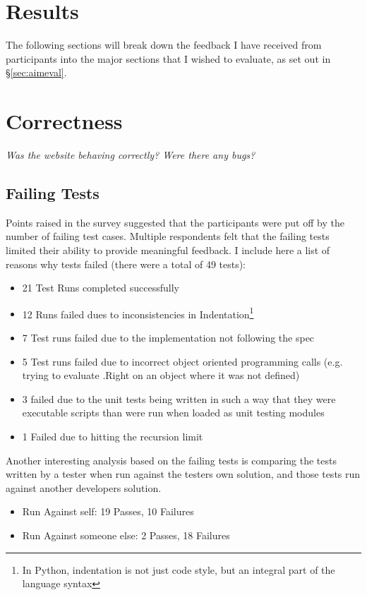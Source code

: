 \documentclass[a4paper,11pt]{report}
\begin{document}
\section*{Results}
The following sections will break down the feedback I have received from participants into the major sections that I wished to evaluate, as set out in \S \ref{sec:aimeval}.

\section{Correctness}
\textit{Was the website behaving correctly? Were there any bugs?}\par
\subsection{Failing Tests}
Points raised in the survey suggested that the participants were put off by the number of failing test cases.  Multiple respondents felt that the failing tests limited  their ability to provide meaningful feedback. I include here a list of reasons why tests failed (there were a total of 49 tests):
\begin{itemize}
\item 21 Test Runs completed successfully
\item 12 Runs failed dues to inconsistencies in Indentation\footnote{In Python, indentation is not just code style, but an integral part of the language syntax}
\item 7 Test runs failed due to the implementation not following the spec
\item 5 Test runs failed due to incorrect object oriented programming calls (e.g. trying to evaluate .Right on an object where it was not defined)
\item 3 failed due to the unit tests being written in such a way that they were executable scripts than were run when loaded as unit testing modules
\item 1 Failed due to hitting the recursion limit
\end{itemize}
Another interesting analysis based on the failing tests is comparing the tests written by a tester when run against the testers own solution, and those tests run against another developers solution.
\begin{itemize}
\item Run Against self: 19 Passes, 10 Failures
\item Run Against someone else: 2 Passes, 18 Failures
\end{itemize}
\end{document}
